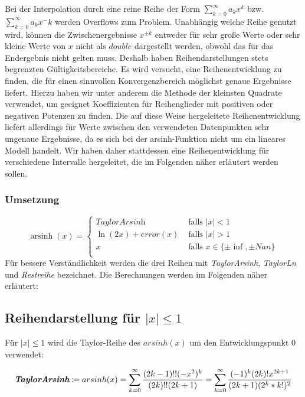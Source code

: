 \documentclass[course=erap] {aspdoc}
\begin{document}
    Bei der Interpolation durch eine reine Reihe der Form $\sum_{k=0}^{\infty} a_k x^k$ bzw. $\sum_{k=0}^{\infty} a_k x^-k$ werden Overflows zum Problem.
    Unabhängig welche Reihe genutzt wird, können die Zwischenergebnisse $x^{\pm k}$ entweder für sehr große Werte oder sehr kleine Werte von $x$ nicht als $double$ dargestellt werden, obwohl das für das Endergebnis nicht gelten muss.
    Deshalb haben Reihendarstellungen stets begrenzten Gültigkeitsbereiche.
    Es wird versucht, eine Reihenentwicklung zu finden, die für einen sinnvollen Konvergenzbereich möglichst genaue Ergebnisse liefert.
    Hierzu haben wir unter anderem die Methode der kleinsten Quadrate verwendet, um geeignet Koeffizienten für Reihenglieder mit positiven oder negativen Potenzen zu finden.
    Die auf diese Weise hergeleitete Reihenentwicklung liefert allerdings für Werte zwischen den verwendeten Datenpunkten sehr ungenaue Ergebnisse, da es sich bei der arsinh-Funktion nicht um ein lineares Modell handelt.
    Wir haben daher stattdessen eine Reihenentwicklung für verschiedene Intervalle hergeleitet, die im Folgenden näher erläutert werden sollen.

    \subsubsection{Umsetzung}

    \[ \operatorname{arsinh}(x) =
    \begin{cases}
        \textit{TaylorArsinh}     & \text{ falls } |x| < 1 \\
        \ln(2x) + error(x)  & \text{ falls } |x| >1 \\
        x     & \text{ falls } x \in \{\pm\inf, \pm Nan\}\\
    \end{cases}\]
    Für bessere Verständlichkeit werden die drei Reihen mit \textit{TaylorArsinh}, \textit{TaylorLn} und \textit{Restreihe} bezeichnet.
    Die Berechnungen werden im Folgenden näher erläutert:

    \subsection{Reihendarstellung für $|x|\leq 1$}
    Für $|x| \leq 1$ wird die Taylor-Reihe des $arsinh(x)$ um den Entwicklungspunkt 0 verwendet:

    \[
        \textit{\textbf{TaylorArsinh}}\coloneqq arsinh(x) = \sum_{k = 0}^{\infty} \frac{(2k-1)!!(-x^2)^k}{(2k)!!(2k + 1)}
        = \sum_{k = 0}^{\infty} \frac{(-1)^k(2k)!x^{2k + 1}}{(2k + 1)(2^k*k!)^2}
    \]
\end{document}
